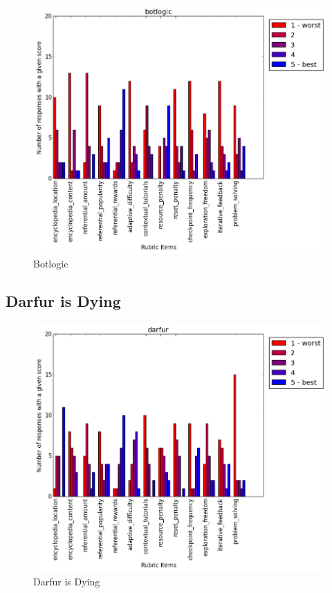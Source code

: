 				\begin{figure}[] 
				\centering 
				\includegraphics[width=\textwidth, height=.4\textheight, keepaspectratio=true]{botlogic_scores.png} 
				\caption{Botlogic}
				\end{figure}

			\subsection{Darfur is Dying}

				\begin{figure}[] 
				\centering 
				\includegraphics[width=\textwidth, height=.4\textheight, keepaspectratio=true]{darfur_scores.png} 
				\caption{Darfur is Dying}
				\end{figure}

